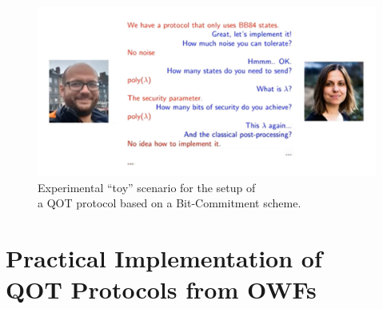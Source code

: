 \documentclass[12pt]{article}
\begin{document}
   \begin{figure}[ht]
        \captionsetup{justification=centering}
        \centering
        \includegraphics[width=\textwidth]{figures/images/img-15.pdf}
        \caption{Experimental ``toy'' scenario for the setup of\\ a QOT protocol based on a Bit-Commitment scheme.}
        \label{fig:experimental-toy-scenario-setup-quantum-oblivious-transfer-protocol-based-bit-commitment-scheme}
    \end{figure}

    
    \section[Practical Implementation of QOT Protocols from OWFs]{Practical Implementation of\\ QOT Protocols from OWFs}
    \label{sec:practical-implementation-qot-protocols-from-owfs}
\end{document}
